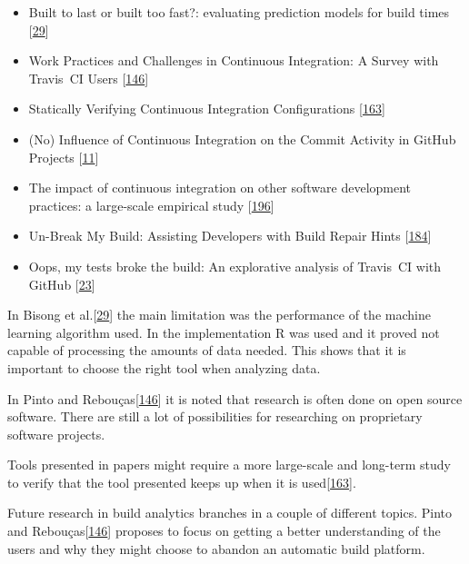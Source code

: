 \documentclass[]{book}
\providecommand{\tightlist}{%
  \setlength{\itemsep}{0pt}\setlength{\parskip}{0pt}}
\begin{document}
\begin{itemize}
\tightlist
\item
  Built to last or built too fast?: evaluating prediction models for
  build times {[}\protect\hyperlink{ref-bisong2017built}{29}{]}
\item
  Work Practices and Challenges in Continuous Integration: A Survey with
  Travis~CI Users {[}\protect\hyperlink{ref-pinto2018work}{146}{]}
\item
  Statically Verifying Continuous Integration Configurations
  {[}\protect\hyperlink{ref-santolucito2018statically}{163}{]}
\item
  (No) Influence of Continuous Integration on the Commit Activity in
  GitHub Projects {[}\protect\hyperlink{ref-baltes2018no}{11}{]}
\item
  The impact of continuous integration on other software development
  practices: a large-scale empirical study
  {[}\protect\hyperlink{ref-zhao2017impact}{196}{]}
\item
  Un-Break My Build: Assisting Developers with Build Repair Hints
  {[}\protect\hyperlink{ref-vassallo2018break}{184}{]}
\item
  Oops, my tests broke the build: An explorative analysis of Travis~CI
  with GitHub {[}\protect\hyperlink{ref-beller2017oops}{23}{]}
\end{itemize}

In Bisong et al.{[}\protect\hyperlink{ref-bisong2017built}{29}{]} the
main limitation was the performance of the machine learning algorithm
used. In the implementation R was used and it proved not capable of
processing the amounts of data needed. This shows that it is important
to choose the right tool when analyzing data.

In Pinto and Rebouças{[}\protect\hyperlink{ref-pinto2018work}{146}{]} it
is noted that research is often done on open source software. There are
still a lot of possibilities for researching on proprietary software
projects.

Tools presented in papers might require a more large-scale and long-term
study to verify that the tool presented keeps up when it is
used{[}\protect\hyperlink{ref-santolucito2018statically}{163}{]}.

Future research in build analytics branches in a couple of different
topics. Pinto and
Rebouças{[}\protect\hyperlink{ref-pinto2018work}{146}{]} proposes to
focus on getting a better understanding of the users and why they might
choose to abandon an automatic build platform.
\end{document}
